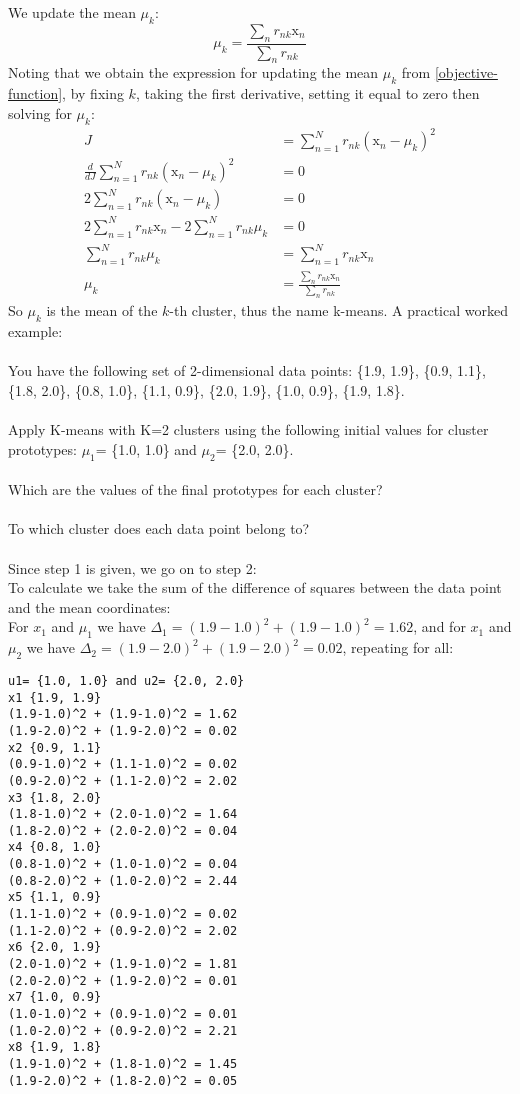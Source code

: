 \documentclass{article}
\begin{document}
We update the mean $\mu_k$:
$$
\mu_k = \frac{\sum_n r_{nk}\mathrm{x}_n}{\sum_n r_{nk}}
$$
Noting that we obtain the expression for updating the mean $\mu_k$ from \ref{objective-function}, by fixing $k$, taking the first derivative, setting it equal to zero then solving for $\mu_k$:
\begin{align*}
    J & = \sum_{n=1}^N r_{nk} (\mathrm{x}_n-\mu_k)^2 \\
    \frac{d}{dJ}\sum_{n=1}^N r_{nk} (\mathrm{x}_n-\mu_k)^2 & = 0 \\
    2 \sum_{n=1}^N r_{nk} (\mathrm{x}_n-\mu_k) & = 0 \\
    2\sum_{n=1}^N r_{nk}\mathrm{x}_n - 2\sum_{n=1}^N r_{nk}\mu_k & = 0 \\
    \sum_{n=1}^N r_{nk}\mu_k & = \sum_{n=1}^N r_{nk}\mathrm{x}_n \\
    \mu_k & = \frac{\sum_n r_{nk}\mathrm{x}_n}{\sum_n r_{nk}}    
\end{align*}
So $\mu_k$ is the mean of the $k$-th cluster, thus the name k-means. A practical worked example: \\
\\
You have the following set of 2-dimensional data points: \{1.9, 1.9\}, \{0.9, 1.1\}, \{1.8, 2.0\}, \{0.8, 1.0\}, \{1.1, 0.9\}, \{2.0, 1.9\}, \{1.0, 0.9\}, \{1.9, 1.8\}. \\
\\
Apply K-means with K=2 clusters using the following initial values for cluster prototypes: $\mu_1$= \{1.0, 1.0\} and $\mu_2$= \{2.0, 2.0\}. \\
\\
Which are the values of the final prototypes for each cluster? \\
\\
To which cluster does each data point belong to? \\
\\
Since step 1 is given, we go on to step 2: \\
To calculate we take the sum of the difference of squares between the data point and the mean coordinates: \\
For $x_1$ and $\mu_1$ we have $\Delta_1 = (1.9-1.0)^2+(1.9-1.0)^2 = 1.62$, and for $x_1$ and $\mu_2$ we have $\Delta_2 = (1.9-2.0)^2+(1.9-2.0)^2 = 0.02$, repeating for all:
\begin{verbatim}
u1= {1.0, 1.0} and u2= {2.0, 2.0}
x1 {1.9, 1.9}
(1.9-1.0)^2 + (1.9-1.0)^2 = 1.62
(1.9-2.0)^2 + (1.9-2.0)^2 = 0.02
x2 {0.9, 1.1}
(0.9-1.0)^2 + (1.1-1.0)^2 = 0.02
(0.9-2.0)^2 + (1.1-2.0)^2 = 2.02
x3 {1.8, 2.0}
(1.8-1.0)^2 + (2.0-1.0)^2 = 1.64
(1.8-2.0)^2 + (2.0-2.0)^2 = 0.04
x4 {0.8, 1.0}
(0.8-1.0)^2 + (1.0-1.0)^2 = 0.04
(0.8-2.0)^2 + (1.0-2.0)^2 = 2.44
x5 {1.1, 0.9}
(1.1-1.0)^2 + (0.9-1.0)^2 = 0.02
(1.1-2.0)^2 + (0.9-2.0)^2 = 2.02
x6 {2.0, 1.9}
(2.0-1.0)^2 + (1.9-1.0)^2 = 1.81
(2.0-2.0)^2 + (1.9-2.0)^2 = 0.01
x7 {1.0, 0.9}
(1.0-1.0)^2 + (0.9-1.0)^2 = 0.01
(1.0-2.0)^2 + (0.9-2.0)^2 = 2.21
x8 {1.9, 1.8}
(1.9-1.0)^2 + (1.8-1.0)^2 = 1.45
(1.9-2.0)^2 + (1.8-2.0)^2 = 0.05    
\end{verbatim}
\end{document}
